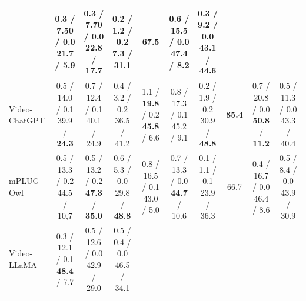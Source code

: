 \begin{table}[h]
{{\begin{tabular}{l|ccc|cccc|cc}
& \makecell[c]{0.3 / 7.50 / 0.0 \\21.7 / 5.9}
& \makecell[c]{0.3 / 7.70 / 0.0 \\22.8 / \textbf{17.7}}
& \makecell[c]{0.2 / 1.2 / 0.2 \\7.3 / 31.1}
& 67.5 

& \makecell[c]{0.6 / 15.5 / 0.0 \\ 47.4 / 8.2}
& \makecell[c]{0.3 / 9.2 / 0.0 \\ 43.1 / 44.6} \\


\toprule
Video-ChatGPT \cite{maaz2023videochatgpt} 
& \makecell[c]{0.5 / 14.0 / 0.1 \\ 39.9 / \textbf{24.3}}
& \makecell[c]{0.7 / 12.4 / 0.1 \\ 40.1 / 24.9}
& \makecell[c]{0.4 / 3.2 / 0.2 \\ 36.5 / 41.2}

& \makecell[c]{1.1 / \textbf{19.8} / 0.2 \\ \textbf{45.8} / 6.6}
& \makecell[c]{0.8 / 17.3 / 0.1 \\ 45.2 / 9.1}
& \makecell[c]{0.2 / 1.9 / 0.2 \\ 30.9 / \textbf{48.8}}
& \textbf{85.4} 

& \makecell[c]{0.7 / 20.8 / 0.0 \\ \textbf{50.8} / \textbf{11.2}}
& \makecell[c]{0.5 / 11.3 / 0.0 \\ 43.3 / 40.4} \\


\toprule
mPLUG-Owl \cite{ye2023mplugowl} 
& \makecell[c]{0.5 / 13.3 / 0.2 \\  44.5 / 10,7}
& \makecell[c]{0.5 / 13.2 / 0.2 \\ \textbf{47.3} / \textbf{35.0}}
& \makecell[c]{0.6 / 5.3 / 0.0 \\ 29.8 / \textbf{48.8}}

& \makecell[c]{0.8 / 16.5 / 0.1 \\ 43.0 / 5.0}
& \makecell[c]{0.7 / 13.3 / 0.0 \\ \textbf{44.7 }/ 10.6}
& \makecell[c]{0.1 / 1.1 / 0.1 \\ 23.9 / 36.3}
& 66.7 

& \makecell[c]{0.4 / 16.7 / 0.0 \\ 46.4 / 8.6}
& \makecell[c]{0.5 / 8.4 / 0.0 \\ 43.9 / 30.9} \\

\toprule
Video-LLaMA \cite{damonlpsg2023videollama} 
& \makecell[c]{0.3 / 12.1 / 0.1 \\ \textbf{48.4} / 7.7}
& \makecell[c]{0.5 / 12.6 / 0.0 \\ 42.9 / 29.0}
& \makecell[c]{0.5 / 0.4 / 0.0 \\ 46.5 / 34.1}


\end{tabular}}}
\end{table}
